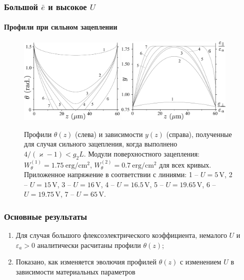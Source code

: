 \documentclass[utf8,secheader]{beamer}
\begin{document}
\begin{frame}
\frametitle{Большой $\bar{e}$ и высокое $U$}
\framesubtitle{Профили при сильном зацеплении}
\begin{figure}[ht]
\includegraphics[width=0.45\textwidth]{Fig3_theta_high_anchoring.eps}%
\includegraphics[width=0.49\textwidth]{Fig3_y_high_anchoring.eps}
\caption{ Профили $\theta(z)$ (слева) и зависимости $y(z)$ (справа), полученные для случая сильного зацепления, когда выполнено $4/(\varkappa - 1)< g_2 L$. Модули поверхностного зацепления: $W_\theta^{(1)}=1.75\ \mathrm{erg}/\mathrm{cm}^2$, $W_\theta^{(2)} = 0.7\ \mathrm{erg}/\mathrm{cm}^2$ для всех кривых. Приложенное напряжение в соответствии с линиями: 1 -- $U = 5\,\mathrm{V}$, 2 -- $U = 15\,\mathrm{V}$, 3 -- $U = 16\,\mathrm{V}$, 4 -- $U = 16.5\,\mathrm{V}$, 5 -- $U = 19.65\,\mathrm{V}$, 6 -- $U = 19.75\,\mathrm{V}$, 7 -- $U = 65\,\mathrm{V}$.}
\end{figure}
\end{frame}


\begin{frame}
\frametitle{Основные результаты}
\begin{enumerate}
\item Для случая большого флексоэлектрического коэффициента, немалого $U$ и $\varepsilon_a > 0$ аналитически расчитаны профили $\theta(z)$;
\item Показано, как изменяется эволючия профилей $\theta(z)$ с изменением $U$ в зависимости материальных параметров
\end{enumerate}
\end{frame}
\end{document}
